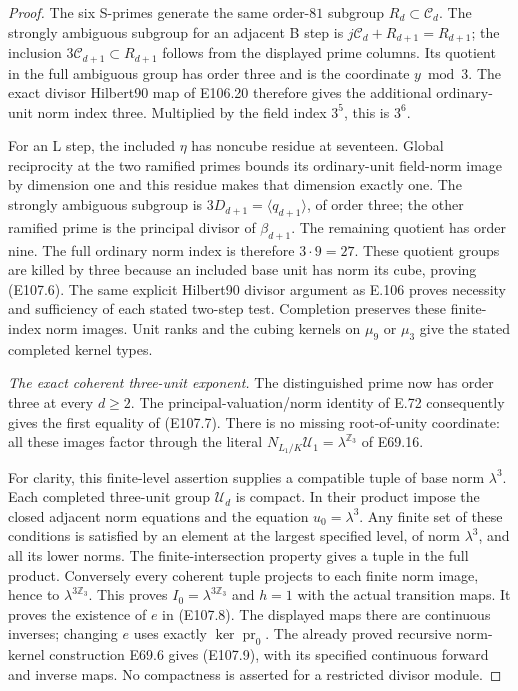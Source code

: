 \begin{proof}
The six S-primes generate the same order-\(81\) subgroup
\(R_d\subset\mathcal C_d\). The strongly ambiguous subgroup
for an adjacent B step is \(j\mathcal C_d+R_{d+1}=R_{d+1}\);
the inclusion \(3\mathcal C_{d+1}\subset R_{d+1}\) follows
from the displayed prime columns. Its quotient in the full
ambiguous group has order three and is the coordinate \(y\bmod3\).
The exact divisor Hilbert90 map of E106.20 therefore gives the
additional ordinary-unit norm index three. Multiplied by the
field index \(3^5\), this is \(3^6\).

For an L step, the included \(\eta\) has noncube residue at seventeen.
Global reciprocity at the two ramified primes bounds its
ordinary-unit field-norm image by dimension one and this residue
makes that dimension exactly one. The strongly ambiguous subgroup
is \(3D_{d+1}=\langle q_{d+1}\rangle\), of order three;
the other ramified prime is the principal divisor of \(\beta_{d+1}\).
The remaining quotient has order nine. The full ordinary
norm index is therefore \(3\cdot9=27\). These quotient groups
are killed by three because an included base unit has norm its
cube, proving (E107.6).
The same explicit Hilbert90 divisor argument as E.106 proves
necessity and sufficiency of each stated two-step test.
Completion preserves these finite-index norm images.
Unit ranks and the cubing kernels on \(\mu_9\) or \(\mu_3\)
give the stated completed kernel types.

\emph{The exact coherent three-unit exponent.}
The distinguished prime now has order three at every \(d\ge2\).
The principal-valuation/norm identity of E.72 consequently gives
the first equality of (E107.7). There is no missing root-of-unity
coordinate: all these images factor through the literal
\(N_{L_1/K}\mathcal U_1=\lambda^{\mathbb Z_3}\) of E69.16.

For clarity, this finite-level assertion supplies a compatible
tuple of base norm \(\lambda^3\). Each completed three-unit group
\(\mathcal U_d\) is compact. In their product impose the closed
adjacent norm equations and the equation \(u_0=\lambda^3\).
Any finite set of these conditions is satisfied by an element
at the largest specified level, of norm \(\lambda^3\), and all
its lower norms. The finite-intersection property gives a tuple
in the full product. Conversely every coherent tuple projects
to each finite norm image, hence to \(\lambda^{3\mathbb Z_3}\).
This proves \(I_0=\lambda^{3\mathbb Z_3}\) and \(h=1\) with
the actual transition maps.
It proves the existence of \(e\) in (E107.8).
The displayed maps there are continuous inverses; changing \(e\)
uses exactly \(\ker\operatorname{pr}_0\).
The already proved recursive norm-kernel construction E69.6
gives (E107.9), with its specified continuous forward and inverse
maps. No compactness is asserted for a restricted divisor module.


\end{proof}
